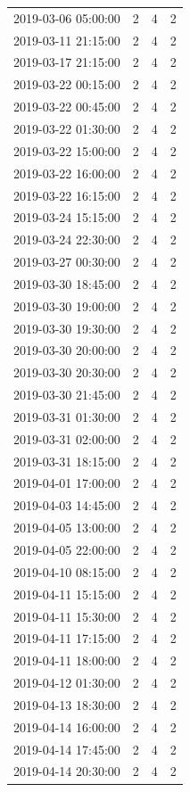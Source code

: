 \begin{tabular}{lrrr}
2019-03-06 05:00:00 & 2 & 4 & 2 \\
2019-03-11 21:15:00 & 2 & 4 & 2 \\
2019-03-17 21:15:00 & 2 & 4 & 2 \\
2019-03-22 00:15:00 & 2 & 4 & 2 \\
2019-03-22 00:45:00 & 2 & 4 & 2 \\
2019-03-22 01:30:00 & 2 & 4 & 2 \\
2019-03-22 15:00:00 & 2 & 4 & 2 \\
2019-03-22 16:00:00 & 2 & 4 & 2 \\
2019-03-22 16:15:00 & 2 & 4 & 2 \\
2019-03-24 15:15:00 & 2 & 4 & 2 \\
2019-03-24 22:30:00 & 2 & 4 & 2 \\
2019-03-27 00:30:00 & 2 & 4 & 2 \\
2019-03-30 18:45:00 & 2 & 4 & 2 \\
2019-03-30 19:00:00 & 2 & 4 & 2 \\
2019-03-30 19:30:00 & 2 & 4 & 2 \\
2019-03-30 20:00:00 & 2 & 4 & 2 \\
2019-03-30 20:30:00 & 2 & 4 & 2 \\
2019-03-30 21:45:00 & 2 & 4 & 2 \\
2019-03-31 01:30:00 & 2 & 4 & 2 \\
2019-03-31 02:00:00 & 2 & 4 & 2 \\
2019-03-31 18:15:00 & 2 & 4 & 2 \\
2019-04-01 17:00:00 & 2 & 4 & 2 \\
2019-04-03 14:45:00 & 2 & 4 & 2 \\
2019-04-05 13:00:00 & 2 & 4 & 2 \\
2019-04-05 22:00:00 & 2 & 4 & 2 \\
2019-04-10 08:15:00 & 2 & 4 & 2 \\
2019-04-11 15:15:00 & 2 & 4 & 2 \\
2019-04-11 15:30:00 & 2 & 4 & 2 \\
2019-04-11 17:15:00 & 2 & 4 & 2 \\
2019-04-11 18:00:00 & 2 & 4 & 2 \\
2019-04-12 01:30:00 & 2 & 4 & 2 \\
2019-04-13 18:30:00 & 2 & 4 & 2 \\
2019-04-14 16:00:00 & 2 & 4 & 2 \\
2019-04-14 17:45:00 & 2 & 4 & 2 \\
2019-04-14 20:30:00 & 2 & 4 & 2 \\

\end{tabular}
